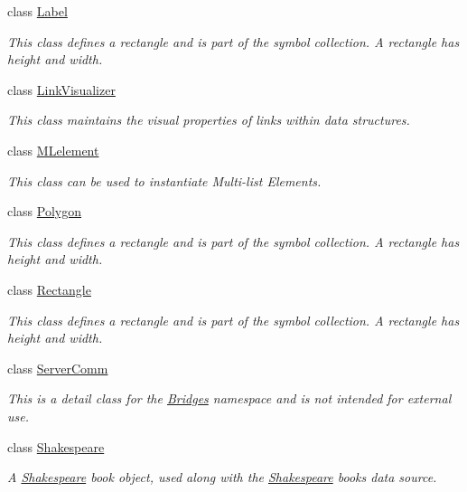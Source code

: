 \begin{DoxyCompactItemize}
class \hyperlink{classbridges_1_1_label}{Label}
\begin{DoxyCompactList}\small\item\em This class defines a rectangle and is part of the symbol collection. A rectangle has height and width. \end{DoxyCompactList}\item 
class \hyperlink{classbridges_1_1_link_visualizer}{Link\+Visualizer}
\begin{DoxyCompactList}\small\item\em This class maintains the visual properties of links within data structures. \end{DoxyCompactList}\item 
class \hyperlink{classbridges_1_1_m_lelement}{M\+Lelement}
\begin{DoxyCompactList}\small\item\em This class can be used to instantiate Multi-\/list Elements. \end{DoxyCompactList}\item 
class \hyperlink{classbridges_1_1_polygon}{Polygon}
\begin{DoxyCompactList}\small\item\em This class defines a rectangle and is part of the symbol collection. A rectangle has height and width. \end{DoxyCompactList}\item 
class \hyperlink{classbridges_1_1_rectangle}{Rectangle}
\begin{DoxyCompactList}\small\item\em This class defines a rectangle and is part of the symbol collection. A rectangle has height and width. \end{DoxyCompactList}\item 
class \hyperlink{classbridges_1_1_server_comm}{Server\+Comm}
\begin{DoxyCompactList}\small\item\em This is a detail class for the \hyperlink{classbridges_1_1_bridges}{Bridges} namespace and is not intended for external use. \end{DoxyCompactList}\item 
class \hyperlink{classbridges_1_1_shakespeare}{Shakespeare}
\begin{DoxyCompactList}\small\item\em A \hyperlink{classbridges_1_1_shakespeare}{Shakespeare} book object, used along with the \hyperlink{classbridges_1_1_shakespeare}{Shakespeare} books data source. \end{DoxyCompactList}\item 

\end{DoxyCompactItemize}
